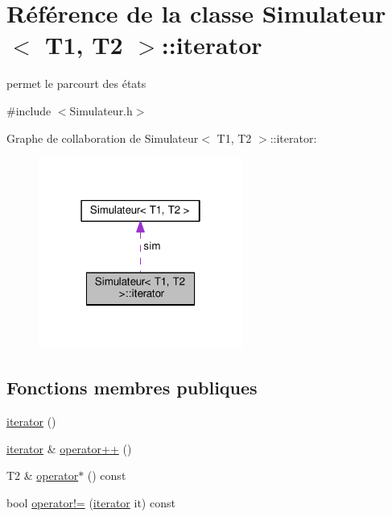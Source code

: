 \hypertarget{class_simulateur_1_1iterator}{}\section{Référence de la classe Simulateur$<$ T1, T2 $>$\+:\+:iterator}
\label{class_simulateur_1_1iterator}


permet le parcourt des états  




{\ttfamily \#include $<$Simulateur.\+h$>$}



Graphe de collaboration de Simulateur$<$ T1, T2 $>$\+:\+:iterator\+:\nopagebreak
\begin{figure}[H]
\begin{center}
\leavevmode
\includegraphics[width=190pt]{class_simulateur_1_1iterator__coll__graph}
\end{center}
\end{figure}
\subsection*{Fonctions membres publiques}
\begin{DoxyCompactItemize}
\item 
\hyperlink{class_simulateur_1_1iterator_a58f9a120930f75d59cc51448522b4870}{iterator} ()
\item 
\hyperlink{class_simulateur_1_1iterator}{iterator} \& \hyperlink{class_simulateur_1_1iterator_a07d32e6e5ea6ab1f8af9a23477cc8e23}{operator++} ()
\item 
T2 \& \hyperlink{class_simulateur_1_1iterator_a878896cca49dae651ef66a2197856772}{operator$\ast$} () const 
\item 
bool \hyperlink{class_simulateur_1_1iterator_ac3692e096d4fc5005eb915f46c562efe}{operator!=} (\hyperlink{class_simulateur_1_1iterator}{iterator} it) const 
\end{DoxyCompactItemize}
